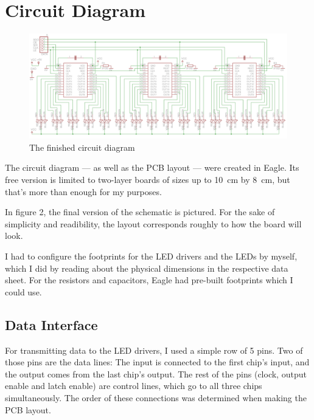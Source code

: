 \documentclass[a4paper, 11pt, titlepage]{report}
\begin{document}
\newpage
\section{Circuit Diagram}

\begin{figure}[h]
\vspace{4mm}
\includegraphics[width=\textwidth]{./images/schematic.png}
\vspace{-8mm}
\caption{The finished circuit diagram}
\vspace{6mm}
\end{figure}

The circuit diagram --- as well as the PCB layout --- were created in Eagle. Its free version is
limited to two-layer boards of sizes up to \SI{10}{\centi\meter} by \SI{8}{\centi\meter}, but
that's more than enough for my purposes.

In figure 2, the final version of the schematic is pictured. For the sake of simplicity and
readibility, the layout corresponds roughly to how the board will look.

I had to configure the footprints for the LED drivers and the LEDs by myself, which I did by
reading about the physical dimensions in the respective data sheet. For the resistors and
capacitors, Eagle had pre-built footprints which I could use.

\subsection{Data Interface}

For transmitting data to the LED drivers, I used a simple row of 5 pins. Two of those pins are the
data lines: The input is connected to the first chip's input, and the output comes from the last
chip's output. The rest of the pins (clock, output enable and latch enable) are control lines,
which go to all three chips simultaneously. The order of these connections was determined when
making the PCB layout.
\end{document}
